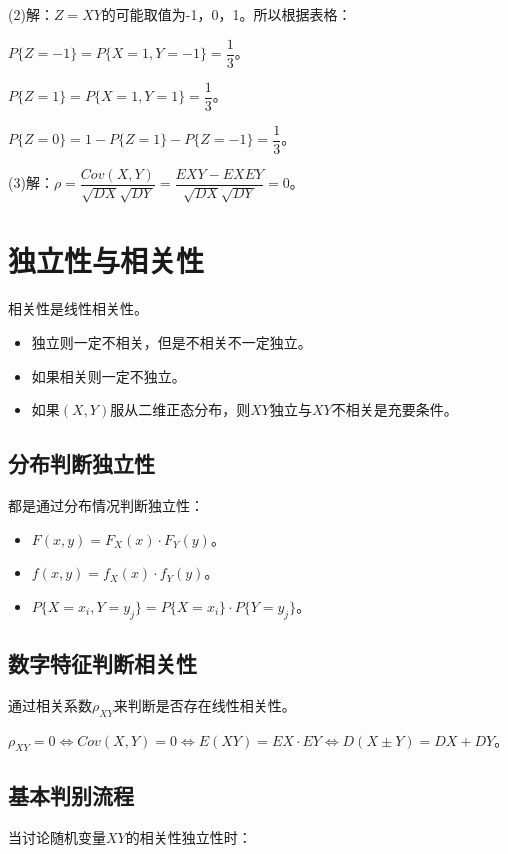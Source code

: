 (2)解：$Z=XY$的可能取值为-1，0，1。所以根据表格：

$P\{Z=-1\}=P\{X=1,Y=-1\}=\dfrac{1}{3}$。

$P\{Z=1\}=P\{X=1,Y=1\}=\dfrac{1}{3}$。

$P\{Z=0\}=1-P\{Z=1\}-P\{Z=-1\}=\dfrac{1}{3}$。

(3)解：$\rho=\dfrac{Cov(X,Y)}{\sqrt{DX}\sqrt{DY}}=\dfrac{EXY-EXEY}{\sqrt{DX}\sqrt{DY}}=0$。

\section{独立性与相关性}

相关性是线性相关性。

\begin{itemize}
    \item 独立则一定不相关，但是不相关不一定独立。
    \item 如果相关则一定不独立。
    \item 如果$(X,Y)$服从二维正态分布，则$XY$独立与$XY$不相关是充要条件。
\end{itemize}

\subsection{分布判断独立性}

都是通过分布情况判断独立性：

\begin{itemize}
    \item $F(x,y)=F_X(x)\cdot F_Y(y)$。
    \item $f(x,y)=f_X(x)\cdot f_Y(y)$。
    \item $P\{X=x_i,Y=y_j\}=P\{X=x_i\}\cdot P\{Y=y_j\}$。
\end{itemize}

\subsection{数字特征判断相关性}

通过相关系数$\rho_{XY}$来判断是否存在线性相关性。

$\rho_{XY}=0\Leftrightarrow Cov(X,Y)=0\Leftrightarrow E(XY)=EX\cdot EY\Leftrightarrow D(X\pm Y)=DX+DY$。

\subsection{基本判别流程}

当讨论随机变量$XY$的相关性独立性时：


